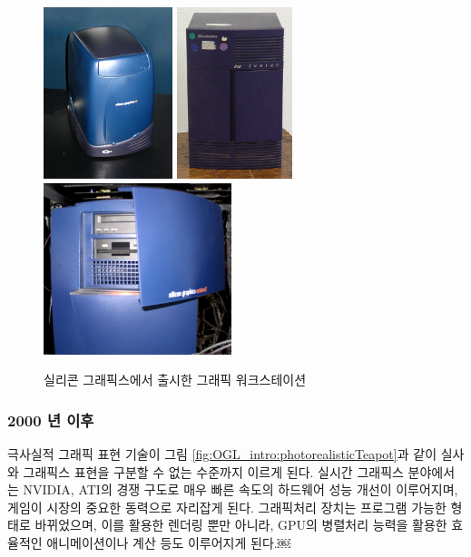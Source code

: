 \begin{figure}[h!]
  \centering
    \includegraphics[height=5cm]{OGL_intro/SGI_O2.jpg}
    \includegraphics[height=5cm]{OGL_intro/SGI_Indigo.jpg}
    \includegraphics[height=5cm]{OGL_intro/SGI_Octane.png}
    \caption{실리콘 그래픽스에서 출시한 그래픽 워크스테이션}
    \label{fig:OGL_intro:SGI}
\end{figure}

\subsubsection{2000 년 이후}

극사실적 그래픽 표현 기술이 그림 \ref{fig:OGL_intro:photorealisticTeapot}과 같이 실사와 그래픽스 표현을 구분할 수 없는 수준까지 이르게 된다. 실시간 그래픽스 분야에서는 NVIDIA, ATI의 경쟁 구도로 매우 빠른 속도의 하드웨어 성능 개선이 이루어지며, 게임이 시장의 중요한 동력으로 자리잡게 된다. 그래픽처리 장치는 프로그램 가능한 형태로 바뀌었으며, 이를 활용한 렌더링 뿐만 아니라, GPU의 병렬처리 능력을 활용한 효율적인 애니메이션이나 계산 등도 이루어지게 된다.￼

